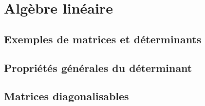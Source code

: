 \documentclass[french, 12pt]{article}
\numberwithin{exercise}{section}
\numberwithin{equation}{section}
\begin{document}


\section{Algèbre linéaire} 
\newcommand{\alglin}{/home/robin/ENSEIGN/Cours/MathBiologie/L3-ENS-Math1/Exercices/AlgLin}

\subsection{Exemples de matrices et déterminants}%







\subsection{Propriétés générales du déterminant}%





\subsection{Matrices diagonalisables}%





\end{document}
